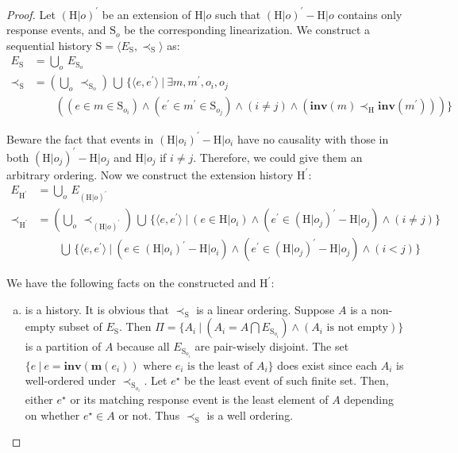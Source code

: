 \documentclass[a4paper,USenglish]{lipics-v2016}
\newcommand{\linz}{linearization}
\newcommand{\myinv}{\textbf{inv}}
\newcommand{\mym}{\textbf{m}}
\newcommand{\his}{\text{H}}
\newcommand{\shis}{\text{S}}
\newcommand{\evts}{\textit{E}}
\newcommand{\myvert}{\vert}
\newcommand{\mybigvert}{ \ \vert \ }
\begin{document}
\begin{proof}
	Let $(\his \myvert o)^\prime$
	be an extension of $\his \myvert o$ such that $(\his \myvert o)^\prime - \his \myvert o$ contains only response events, and $\shis_o$ be the corresponding {\linz}.
	We construct a sequential history $\shis = \langle \evts_{\shis}, \prec_{\shis} \rangle$ as:
	\begin{align*}
	\evts_{\shis} &= \bigcup\limits_o \, \evts_{\shis_o}\\
	\prec_{\shis} &= (\bigcup\limits_o \, \prec_{\shis_o}) \, \bigcup \, \{\langle e, e^\prime \rangle \mybigvert \exists m, m^\prime, o_i, o_j\\
	&\qquad ((e \in m \in \shis_{o_i}) \land (e^\prime \in m^\prime \in \shis_{o_j}) \land (i \neq j) \land (\myinv(m) \prec_{\his} \myinv(m^\prime)))\}
	\end{align*}
	
	Beware the fact that events in $(\his \myvert o_i)^\prime - \his \myvert o_i$ have no causality with those in both $(\his \myvert o_j)^\prime - \his \myvert o_j$ and $\his \myvert o_j$ if $i \neq j$.
	Therefore, we could give them an arbitrary ordering.
	Now we construct the extension history $\his^\prime$:
	\begin{align*}
	\evts_{\his^\prime} &= \bigcup\limits_o \, \evts_{(\his \myvert o)^\prime}\\
	\prec_{\his^\prime} &= (\bigcup\limits_o \, \prec_{(\his \myvert o)^\prime}) \, \bigcup \, \{\langle e, e^\prime \rangle \mybigvert (e \in \his \myvert o_i) \land (e^\prime \in (\his \myvert o_j)^\prime - \his \myvert o_j) \land (i \neq j)\}\\
	&\qquad \bigcup \, \{\langle e, e^\prime \rangle \mybigvert (e \in (\his \myvert o_i)^\prime - \his \myvert o_i) \land (e^\prime \in (\his \myvert o_j)^\prime - \his \myvert o_j) \land (i < j)\}
	\end{align*}
	
	We have the following facts on the constructed {\shis} and $\his^\prime$:
	\begin{enumerate}[(a)]
		\item
		{\shis} is a history. It is obvious that $\prec_{\shis}$ is a linear ordering.
		Suppose $A$ is a non-empty subset of $\evts_{\shis}$.
		Then $\Pi = \{A_i \mybigvert (A_i = A \bigcap \evts_{\shis_{o_i}}) \land (A_i \text{ is not empty})\}$ is a partition of $A$
		because all $\evts_{\shis_{o_i}}$ are pair-wisely disjoint.
		The set $\{e \mybigvert e = \myinv(\mym(e_i)) \text{ where } e_i \text{ is the least of } A_i\}$ does exist since each $A_i$ is well-ordered under $\prec_{\shis_{o_i}}$.
		Let $e^\star$ be the least event of such finite set.	
		Then, either $e^\star$ or its matching response event is the least element of $A$ depending on whether $e^\star \in A$ or not.
		Thus $\prec_{\shis}$ is a well ordering.
		

\end{enumerate}
\end{proof}
\end{document}
